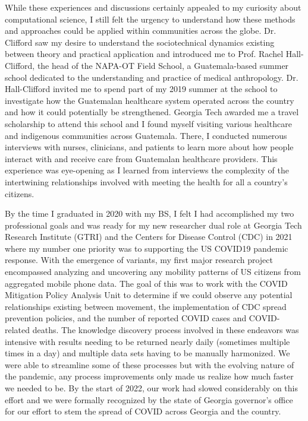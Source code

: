 \documentclass[11pt]{extarticle}
\begin{document}
While these experiences and discussions certainly appealed to my curiosity about computational science, I still felt the urgency to understand how these methods and approaches could be applied within communities across the globe.
Dr. Clifford saw my desire to understand the sociotechnical dynamics existing between theory and practical application and introduced me to Prof. Rachel Hall-Clifford, the head of the NAPA-OT Field School, a Guatemala-based summer school dedicated to the understanding and practice of medical anthropology.
Dr. Hall-Clifford invited me to spend part of my 2019 summer at the school to investigate how the Guatemalan healthcare system operated across the country and how it could potentially be strengthened.
Georgia Tech awarded me a travel scholarship to attend this school and I found myself visiting various healthcare and indigenous communities across Guatemala.
There, I conducted numerous interviews with nurses, clinicians, and patients to learn more about how people interact with and receive care from Guatemalan healthcare providers.
This experience was eye-opening as I learned from interviews the complexity of the intertwining relationships involved with  meeting the health for all a country's citizens.

By the time I graduated in 2020 with my BS, I felt I had accomplished my two professional goals and was ready for my new researcher dual role at Georgia Tech Research Institute (GTRI) and the Centers for Disease Control (CDC) in 2021 where my number one priority was to supporting the US COVID19 pandemic response.
With the emergence of variants, my first major research project encompassed analyzing and uncovering any mobility patterns of US citizens from aggregated mobile phone data.
The goal of this was to work with the COVID Mitigation Policy Analysis Unit to determine if we could observe any potential relationships existing between movement, the implementation of CDC spread prevention policies, and the number of reported COVID cases and COVID-related deaths.
The knowledge discovery process involved in these endeavors was intensive with results needing to be returned nearly daily (sometimes multiple times in a day) and multiple data sets having to be manually harmonized.
We were able to streamline some of these processes but with the evolving nature of the pandemic, any process improvements only made us realize how much faster we needed to be.
By the start of 2022, our work had slowed considerably on this effort and we were formally recognized by the state of Georgia governor's office for our effort to stem the spread of COVID across Georgia and the country.
\end{document}
